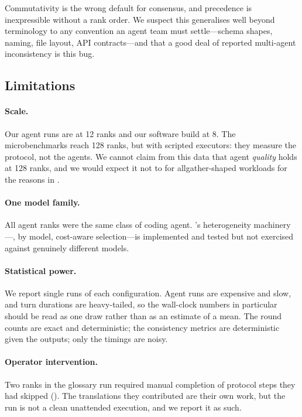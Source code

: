 Commutativity is the wrong default for consensus, and precedence is
inexpressible without a rank order. We suspect this generalises well beyond
terminology to any convention an agent team must settle---schema shapes,
naming, file layout, API contracts---and that a good deal of reported
multi-agent inconsistency is this bug.

\subsection{Limitations}

\paragraph{Scale.} Our agent runs are at 12 ranks and our software build at
8. The microbenchmarks reach 128 ranks, but with scripted executors: they
measure the protocol, not the agents. We cannot claim from this data that
agent \emph{quality} holds at 128 ranks, and we would expect it not to for
allgather-shaped workloads for the reasons in .

\paragraph{One model family.} All agent ranks were the same class of coding
agent. \ampi{}'s heterogeneity machinery---,
 by model, cost-aware selection---is implemented and
tested but not exercised against genuinely different models.

\paragraph{Statistical power.} We report single runs of each configuration.
Agent runs are expensive and slow, and turn durations are heavy-tailed, so
the wall-clock numbers in particular should be read as one draw rather than
as an estimate of a mean. The round counts are exact and deterministic; the
consistency metrics are deterministic given the outputs; only the timings
are noisy.

\paragraph{Operator intervention.} Two ranks in the glossary run required
manual completion of protocol steps they had skipped
(). The translations they contributed are
their own work, but the run is not a clean unattended execution, and we
report it as such.

